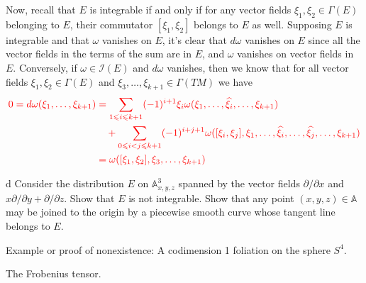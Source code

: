 \documentclass{../../templates/lkx_pset}
\begin{document}
\begin{parts}
	Now, recall that $E$ is integrable if and only if for any vector fields $\xi_1,\xi_2\in \Gamma(E)$ belonging to $E$, their commutator $[\xi_1, \xi_2]$ belongs to $E$ as well. Supposing $E$ is integrable and that $\omega$ vanishes on $E$, it's clear that $d\omega$ vanishes on $E$ since all the vector fields in the terms of the sum are in $E$, and $\omega$ vanishes on vector fields in $E$. Conversely, if $\omega\in \mathcal{I}(E)$ and $d\omega$ vanishes, then we know that for all vector fields $\xi_1, \xi_2\in \Gamma(E)$ and $\xi_3,\ldots, \xi_{k+1}\in \Gamma(TM)$ we have
	\[
		\textcolor{red}{
			\begin{aligned}
				0=d\omega(\xi_1,\ldots,\xi_{k+1})
				 & = \sum_{1\leq i \leq k+1} (-1)^{i+1} \xi_i\omega(\xi_1,\ldots,\widehat{\xi_i},\ldots, \xi_{k+1})                                              \\
				 & \quad+ \sum_{0\leq i<j\leq k+1} (-1)^{i+j+1}\omega([\xi_i, \xi_j], \xi_1, \ldots, \widehat{\xi_i},\ldots, \widehat{\xi_j}, \ldots, \xi_{k+1}) \\
				 & =\omega([\xi_1, \xi_2], \xi_3,\ldots, \xi_{k+1})
			\end{aligned}
		}
	\]

	\begin{part}{d}
		Consider the distribution $E$ on $\mathbb{A}^3_{x,y,z}$ spanned by the vector fields $\partial/\partial x$ and $x\partial/\partial y + \partial/\partial z$. Show that $E$ is not integrable. Show that any point $(x,y,z)\in \mathbb{A}$ may be joined to the origin by a piecewise smooth curve whose tangent line belongs to $E$.

	\end{part}
\end{parts}

\begin{problem}{3}
Example or proof of nonexistence: A codimension 1 foliation on the sphere $S^4$.
\end{problem}

\begin{solution}
\end{solution}

\begin{problem}{4}
The Frobenius tensor.
\end{problem}
\end{document}
